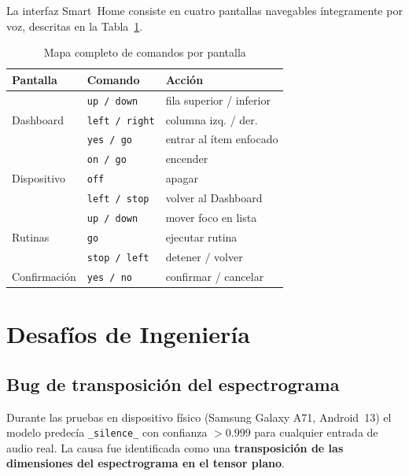 \documentclass[conference]{IEEEtran}
\begin{document}
La interfaz Smart~Home consiste en cuatro pantallas navegables íntegramente por
voz, descritas en la Tabla~\ref{tab:cmdmap}.

\begin{table}[htbp]
\caption{Mapa completo de comandos por pantalla}
\label{tab:cmdmap}
\centering
\begin{tabular}{lll}
\toprule
\textbf{Pantalla} & \textbf{Comando} & \textbf{Acción} \\
\midrule
\multirow{3}{*}{Dashboard}
  & \texttt{up / down}         & fila superior / inferior \\
  & \texttt{left / right}      & columna izq. / der. \\
  & \texttt{yes / go}          & entrar al ítem enfocado \\
\midrule
\multirow{3}{*}{Dispositivo}
  & \texttt{on / go}           & encender \\
  & \texttt{off}               & apagar \\
  & \texttt{left / stop}       & volver al Dashboard \\
\midrule
\multirow{3}{*}{Rutinas}
  & \texttt{up / down}         & mover foco en lista \\
  & \texttt{go}                & ejecutar rutina \\
  & \texttt{stop / left}       & detener / volver \\
\midrule
Confirmación
  & \texttt{yes / no}          & confirmar / cancelar \\
\bottomrule
\end{tabular}
\end{table}

\section{Desafíos de Ingeniería}
\label{sec:bugs}

\subsection{Bug de transposición del espectrograma}

Durante las pruebas en dispositivo físico (Samsung Galaxy A71, Android~13) el
modelo predecía \texttt{\_silence\_} con confianza $> 0.999$ para cualquier
entrada de audio real.  La causa fue identificada como una \textbf{transposición
de las dimensiones del espectrograma en el tensor plano}.
\end{document}
